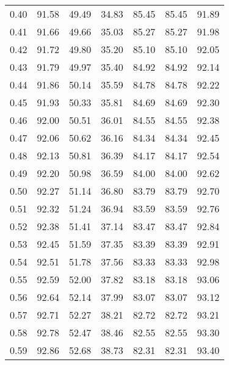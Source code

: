 \begin{tabular}{|c|c|c|c|c|c|c|}
      0.40 &     91.58 &     49.49 &      34.83 &   85.45 &      85.45 &         91.89 \\
      0.41 &     91.66 &     49.66 &      35.03 &   85.27 &      85.27 &         91.98 \\
      0.42 &     91.72 &     49.80 &      35.20 &   85.10 &      85.10 &         92.05 \\
      0.43 &     91.79 &     49.97 &      35.40 &   84.92 &      84.92 &         92.14 \\
      0.44 &     91.86 &     50.14 &      35.59 &   84.78 &      84.78 &         92.22 \\
      0.45 &     91.93 &     50.33 &      35.81 &   84.69 &      84.69 &         92.30 \\
      0.46 &     92.00 &     50.51 &      36.01 &   84.55 &      84.55 &         92.38 \\
      0.47 &     92.06 &     50.62 &      36.16 &   84.34 &      84.34 &         92.45 \\
      0.48 &     92.13 &     50.81 &      36.39 &   84.17 &      84.17 &         92.54 \\
      0.49 &     92.20 &     50.98 &      36.59 &   84.00 &      84.00 &         92.62 \\
      0.50 &     92.27 &     51.14 &      36.80 &   83.79 &      83.79 &         92.70 \\
      0.51 &     92.32 &     51.24 &      36.94 &   83.59 &      83.59 &         92.76 \\
      0.52 &     92.38 &     51.41 &      37.14 &   83.47 &      83.47 &         92.84 \\
      0.53 &     92.45 &     51.59 &      37.35 &   83.39 &      83.39 &         92.91 \\
      0.54 &     92.51 &     51.78 &      37.56 &   83.33 &      83.33 &         92.98 \\
      0.55 &     92.59 &     52.00 &      37.82 &   83.18 &      83.18 &         93.06 \\
      0.56 &     92.64 &     52.14 &      37.99 &   83.07 &      83.07 &         93.12 \\
      0.57 &     92.71 &     52.27 &      38.21 &   82.72 &      82.72 &         93.21 \\
      0.58 &     92.78 &     52.47 &      38.46 &   82.55 &      82.55 &         93.30 \\
      0.59 &     92.86 &     52.68 &      38.73 &   82.31 &      82.31 &         93.40 \\

\end{tabular}
